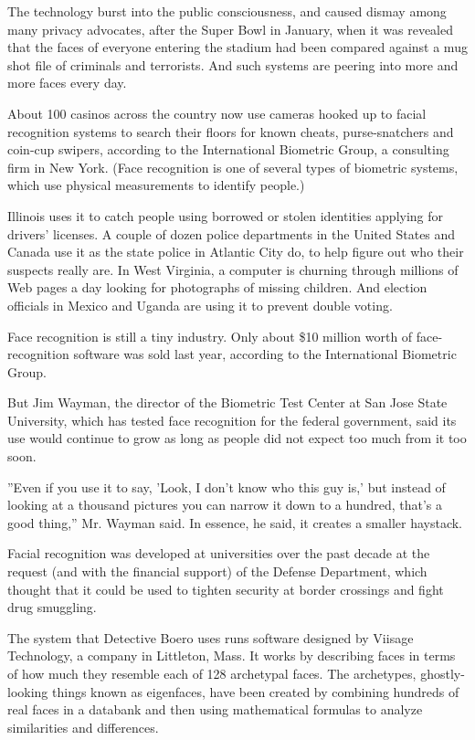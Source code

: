 The technology burst into the public consciousness, and caused dismay
among many privacy advocates, after the Super Bowl in January, when it
was revealed that the faces of everyone entering the stadium had been
compared against a mug shot file of criminals and terrorists. And such
systems are peering into more and more faces every day.

About 100 casinos across the country now use cameras hooked up to facial
recognition systems to search their floors for known cheats,
purse-snatchers and coin-cup swipers, according to the International
Biometric Group, a consulting firm in New York. (Face recognition is one
of several types of biometric systems, which use physical measurements
to identify people.)

Illinois uses it to catch people using borrowed or stolen identities
applying for drivers' licenses. A couple of dozen police departments in
the United States and Canada use it as the state police in Atlantic City
do, to help figure out who their suspects really are. In West Virginia,
a computer is churning through millions of Web pages a day looking for
photographs of missing children. And election officials in Mexico and
Uganda are using it to prevent double voting.

Face recognition is still a tiny industry. Only about \$10 million worth
of face-recognition software was sold last year, according to the
International Biometric Group.

But Jim Wayman, the director of the Biometric Test Center at San Jose
State University, which has tested face recognition for the federal
government, said its use would continue to grow as long as people did
not expect too much from it too soon.

''Even if you use it to say, 'Look, I don't know who this guy is,' but
instead of looking at a thousand pictures you can narrow it down to a
hundred, that's a good thing,'' Mr. Wayman said. In essence, he said, it
creates a smaller haystack.

Facial recognition was developed at universities over the past decade at
the request (and with the financial support) of the Defense Department,
which thought that it could be used to tighten security at border
crossings and fight drug smuggling.

The system that Detective Boero uses runs software designed by Viisage
Technology, a company in Littleton, Mass. It works by describing faces
in terms of how much they resemble each of 128 archetypal faces. The
archetypes, ghostly-looking things known as eigenfaces, have been
created by combining hundreds of real faces in a databank and then using
mathematical formulas to analyze similarities and differences.

